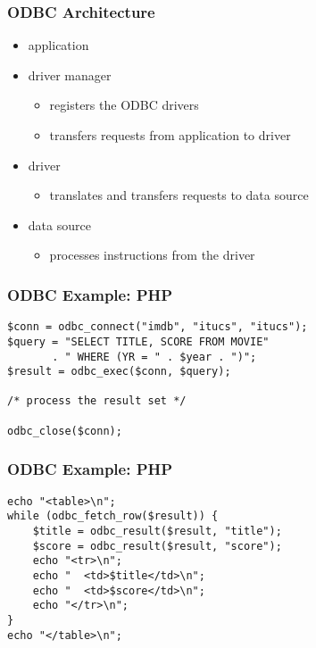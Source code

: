 \documentclass[dvipsnames]{beamer}
\theoremstyle{plain}
\begin{document}
\begin{frame}
  \frametitle{ODBC Architecture}

  \begin{itemize}
    \item application

    \medskip
    \item driver manager
    \begin{itemize}
      \item registers the ODBC drivers
      \item transfers requests from application to driver
    \end{itemize}

    \medskip
    \item driver
    \begin{itemize}
      \item translates and transfers requests to data source
    \end{itemize}

    \medskip
    \item data source
    \begin{itemize}
      \item processes instructions from the driver
    \end{itemize}
  \end{itemize}
\end{frame}

\begin{frame}[fragile]
  \frametitle{ODBC Example: PHP}

  \begin{lstlisting}
$conn = odbc_connect("imdb", "itucs", "itucs");
$query = "SELECT TITLE, SCORE FROM MOVIE"
       . " WHERE (YR = " . $year . ")";
$result = odbc_exec($conn, $query);

/* process the result set */

odbc_close($conn);
  \end{lstlisting}
\end{frame}

\begin{frame}[fragile]
  \frametitle{ODBC Example: PHP}

  \begin{lstlisting}
echo "<table>\n";
while (odbc_fetch_row($result)) {
    $title = odbc_result($result, "title");
    $score = odbc_result($result, "score");
    echo "<tr>\n";
    echo "  <td>$title</td>\n";
    echo "  <td>$score</td>\n";
    echo "</tr>\n";
}
echo "</table>\n";
  \end{lstlisting}
\end{frame}
\end{document}
